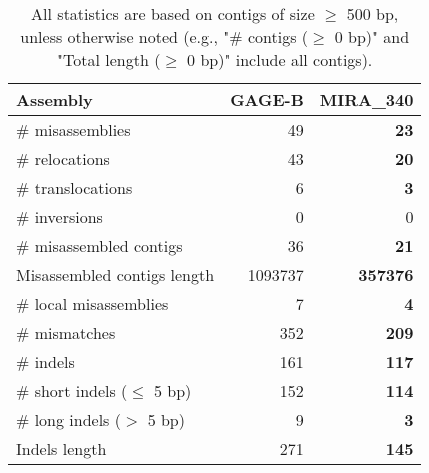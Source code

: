 \documentclass[12pt,a4paper]{article}
\begin{document}
\begin{table}[ht]
\begin{center}
\caption{All statistics are based on contigs of size $\geq$ 500 bp, unless otherwise noted (e.g., "\# contigs ($\geq$ 0 bp)" and "Total length ($\geq$ 0 bp)" include all contigs).}
\begin{tabular}{|l*{2}{|r}|}
\hline
Assembly & GAGE-B & MIRA\_340 \\ \hline
\# misassemblies & 49 & {\bf 23} \\ \hline
\hspace{5mm}\# relocations & 43 & {\bf 20} \\ \hline
\hspace{5mm}\# translocations & 6 & {\bf 3} \\ \hline
\hspace{5mm}\# inversions & 0 & 0 \\ \hline
\# misassembled contigs & 36 & {\bf 21} \\ \hline
Misassembled contigs length & 1093737 & {\bf 357376} \\ \hline
\# local misassemblies & 7 & {\bf 4} \\ \hline
\# mismatches & 352 & {\bf 209} \\ \hline
\# indels & 161 & {\bf 117} \\ \hline
\hspace{5mm}\# short indels ($\leq$ 5 bp) & 152 & {\bf 114} \\ \hline
\hspace{5mm}\# long indels ($>$ 5 bp) & 9 & {\bf 3} \\ \hline
Indels length & 271 & {\bf 145} \\ \hline
\end{tabular}
\end{center}
\end{table}
\end{document}
